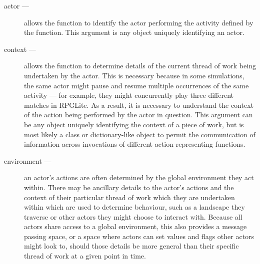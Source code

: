 
\begin{description}
  \item[actor —] allows the function to identify the actor performing the activity
    defined by the function. This argument is any object uniquely identifying an
    actor.
    \item[context —] allows the function to determine details of the current
      thread of work being undertaken by the actor. This is necessary because in
      some simulations, the same actor might pause and resume multiple
      occurrences of the same activity --- for example, they might concurrently
      play three different matches in RPGLite. As a result, it is necessary to
      understand the context of the action being performed by the actor in
      question. This argument can be any object uniquely identifying the context
      of a piece of work, but is most likely a class or dictionary-like object
      to permit the communication of information across invocations of different
      action-representing functions.
      \item[environment —] an actor's actions are often determined by the global
        environment they act within. There may be ancillary details to the
        actor's actions and the context of their particular thread of work which
        they are undertaken within which are used to determine behaviour, such
        as a landscape they traverse or other actors they might choose to
        interact with. Because all actors share access to a global environment,
        this also provides a message passing space, or a space where actors can
        set values and flags other actors might look to, should those details be
        more general than their specific thread of work at a given point in time.
\end{description}

